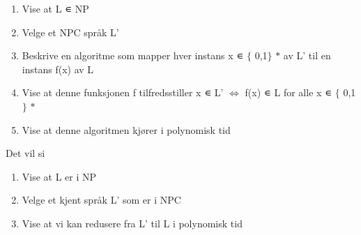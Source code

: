 \documentclass[12pt]{report}
\begin{document}
\begin{enumerate}
	\item Vise at L ∊ NP\par

	\item Velge et NPC språk L’\par

	\item Beskrive en algoritme som mapper hver instans x ∊ $ \{ $ 0,1$ \} $ $\ast$  av L’ til en instans f(x) av L\par

	\item Vise at denne funksjonen f tilfredsstiller x ∊ L’ $ \Leftrightarrow $  f(x) ∊ L for alle x ∊ $ \{ $ 0,1$ \} $ $\ast$  \par

	\item Vise at denne algoritmen kjører i polynomisk tid
\end{enumerate}\par


\vspace{\baselineskip}
Det vil si\par

\begin{enumerate}
	\item Vise at L er i NP\par

	\item Velge et kjent språk L’ som er i NPC\par

	\item Vise at vi kan redusere fra L’ til L i polynomisk tid
\end{enumerate}\par


\vspace{\baselineskip}

\vspace{\baselineskip}



\newpage

\vspace{\baselineskip}\setlength{\parskip}{15.0pt}
\end{document}
